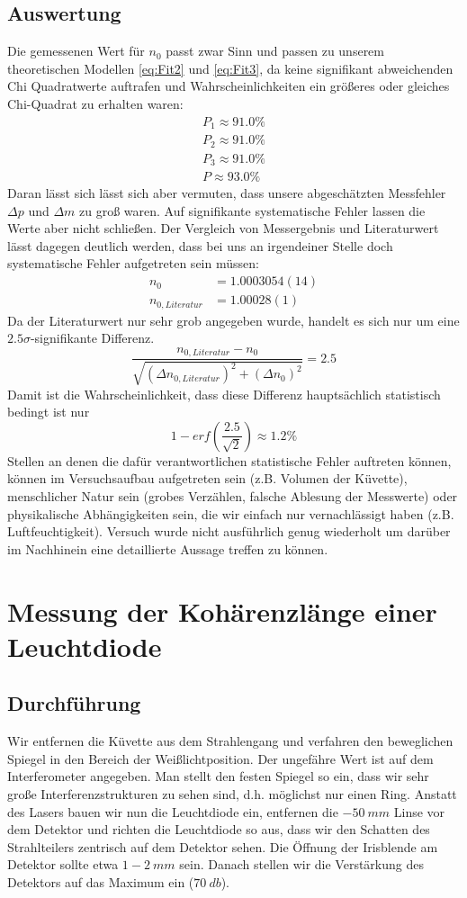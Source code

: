 \documentclass[a4paper,10pt]{article}
\begin{document}
\subsection{Auswertung}
Die gemessenen Wert für \(n_0\) passt zwar Sinn und passen zu unserem theoretischen Modellen \eqref{eq:Fit2} und \eqref{eq:Fit3}, da keine signifikant abweichenden Chi Quadratwerte auftrafen und Wahrscheinlichkeiten ein größeres oder gleiches Chi-Quadrat zu erhalten waren:
\begin{align*}
P_1\approx  91.0 \%\\
P_2\approx  91.0 \%\\
P_3\approx  91.0 \%\\
P\approx  93.0 \%
\end{align*}
Daran lässt sich lässt sich aber vermuten, dass unsere abgeschätzten Messfehler \(\Delta p\) und \(\Delta m\) zu groß waren. Auf signifikante systematische Fehler lassen die Werte aber nicht schließen. Der Vergleich von Messergebnis und Literaturwert lässt dagegen deutlich werden, dass bei uns an irgendeiner Stelle doch systematische Fehler aufgetreten sein müssen:
\begin{align*}
n_0&=1.0003054(14) \\
n_{0, Literatur} &=1.00028(1)
\end{align*}
Da der Literaturwert nur sehr grob angegeben wurde, handelt es sich nur um eine \(2.5\sigma\)-signifikante Differenz.
\[\frac{ n_{0, Literatur}- n_0}{\sqrt{(\Delta  n_{0, Literatur})^2+(\Delta n_0)^2}}= 2.5\]
Damit ist die Wahrscheinlichkeit, dass diese Differenz hauptsächlich statistisch bedingt ist nur \[1-erf{\left({\frac{2.5}{\sqrt{2}}}\right)} \approx 1.2\%\]
Stellen an denen die dafür verantwortlichen statistische Fehler auftreten können, können im Versuchsaufbau aufgetreten sein (z.B. Volumen der Küvette), menschlicher Natur sein (grobes Verzählen, falsche Ablesung der Messwerte) oder physikalische Abhängigkeiten sein, die wir einfach nur vernachlässigt haben (z.B. Luftfeuchtigkeit). Versuch wurde nicht ausführlich genug wiederholt um darüber im Nachhinein eine detaillierte Aussage treffen zu können.

\section{Messung der Kohärenzlänge einer Leuchtdiode}
\subsection[Durchführung]{Durchführung\fnrefb}
Wir entfernen die Küvette aus dem Strahlengang und verfahren den beweglichen Spiegel in den Bereich der Weißlichtposition. Der ungefähre Wert ist auf dem Interferometer angegeben. Man stellt den festen Spiegel so ein, dass wir sehr große Interferenzstrukturen zu sehen sind, d.h. möglichst nur einen Ring. Anstatt des Lasers bauen wir nun die Leuchtdiode ein, entfernen die \(-50\:mm\) Linse vor dem Detektor und richten die Leuchtdiode so aus, dass wir den Schatten des Strahlteilers zentrisch auf dem Detektor sehen. Die Öffnung der Irisblende am Detektor sollte etwa \(1-2\:mm\) sein. Danach stellen wir die Verstärkung des Detektors auf das Maximum ein (\(70\:db\)).\\ 
\end{document}
